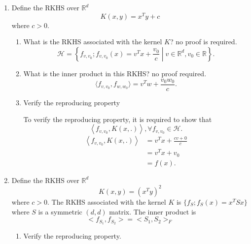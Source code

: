 \documentclass{article}[12pt]
\begin{document}
\begin{enumerate}
\item Define the RKHS  over $\mathbb{R}^d$
$$K(x,y)=x^Ty+c$$
where $c>0$. 
\begin{enumerate}
\item
What is the RKHS associated with the kernel $K$? no proof is required. 
\begin{equation}
\mathcal{H}=\left\{f_{v, v_{0}} ; f_{v, v_{0}}(x)=v^{T} x+\frac{v_{0}}{c} \middle| v \in \mathbb R^d, v_0 \in \mathbb R \right\}.
\end{equation}
\item 
What is the inner product in this RKHS? no proof required.  
\begin{equation}
\langle f_{v, v_0}, f_{w, w_0}\rangle = v^T w+\frac{v_0 w_0}{c}.
\end{equation}
\item 
Verify the reproducing property

To verify the reproducing property, it is required to show that
\begin{equation} \label{equ:repro}
\left\langle f_{v,v_0}, K(x, .)\right\rangle, \forall f_{v,v_0} \in \mathcal{H}.
\end{equation}
\begin{equation}
\begin{aligned}\left\langle f_{v,v_0}, K(x, .)\right\rangle &= v^Tx+\frac{c v+0}{c} \\
&= v^Tx+v_0 \\
&=f(x).\end{aligned}
\end{equation}
\end{enumerate}
\item Define the RKHS  over $\mathbb{R}^d$
$$K(x,y)=(x^Ty)^2$$
where $c>0$. 
The RKHS associated with the kernel $K$ is $\{f_S;f_S(x)=x^T S x\}$ where $S$ is a symmetric $(d,d)$ matrix. The inner product is
\begin{equation} \label{equ:frob}
<f_{S_1},f_{S_2}>=<S_1,S_2>_F
\end{equation}
\begin{enumerate}
\item
Verify the reproducing property. 


\end{enumerate}
\end{enumerate}
\end{document}
